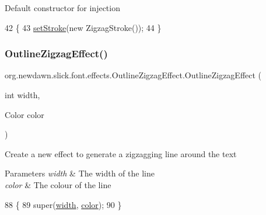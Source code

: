 Default constructor for injection 
\begin{DoxyCode}
42                                  \{
43         \mbox{\hyperlink{classorg_1_1newdawn_1_1slick_1_1font_1_1effects_1_1_outline_effect_aaea80188301a66f869e1a6e3d5cd5cf7}{setStroke}}(\textcolor{keyword}{new} ZigzagStroke());
44     \}
\end{DoxyCode}
\mbox{\label{classorg_1_1newdawn_1_1slick_1_1font_1_1effects_1_1_outline_zigzag_effect_a824ae51797bb7a1404203ae36a842eb8}} 
\subsubsection{\texorpdfstring{Outline\+Zigzag\+Effect()}{OutlineZigzagEffect()}\hspace{0.1cm}{\footnotesize\ttfamily [2/2]}}
{\footnotesize\ttfamily org.\+newdawn.\+slick.\+font.\+effects.\+Outline\+Zigzag\+Effect.\+Outline\+Zigzag\+Effect (\begin{DoxyParamCaption}\item[{int}]{width,  }\item[{Color}]{color }\end{DoxyParamCaption})\hspace{0.3cm}{\ttfamily [inline]}}

Create a new effect to generate a zigzagging line around the text


\begin{DoxyParams}{Parameters}
{\em width} & The width of the line \\
\hline
{\em color} & The colour of the line \\
\hline
\end{DoxyParams}

\begin{DoxyCode}
88                                                        \{
89         super(\mbox{\hyperlink{classorg_1_1newdawn_1_1slick_1_1font_1_1effects_1_1_outline_effect_aad96e33c4fb5804e7423df04e1cc1936}{width}}, \mbox{\hyperlink{classorg_1_1newdawn_1_1slick_1_1font_1_1effects_1_1_outline_effect_a00160c4c005cb659d45c135a2798005f}{color}});
90     \}
\end{DoxyCode}


